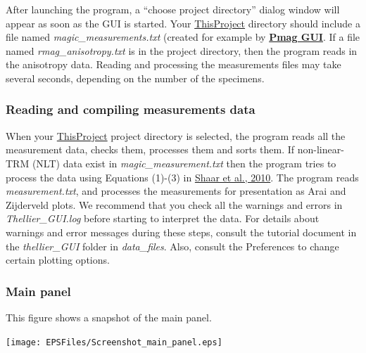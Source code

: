 \documentclass[11pt]{book}
\begin{document}
{{
After launching the program,  a  ``choose project directory'' dialog window will appear as soon as the GUI is started.
%
%
%
Your  \href{#Project_Directory}{ThisProject} directory should include a file named {\it magic\_measurements.txt} (created for example by \href{#pmag_gui.py}{\bf Pmag GUI}.   If a file named {\it rmag\_anisotropy.txt} is in the project directory, then the program reads in the anisotropy data. Reading and processing the measurements files may take several seconds, depending on the number of the specimens.


\subsubsection{Reading and compiling measurements data}
When your \href{#Project_Directory}{ThisProject}  project directory is selected, the program  reads all the measurement data, checks them, processes them and sorts them. If non-linear-TRM (NLT) data exist in {\it magic\_measurement.txt}  then the program tries to process the data using Equations (1)-(3) in \href{http://dx.doi.org/10.7288/V4/MAGIC/12116}{Shaar et al., 2010}. \nocite{shaar10}  The program reads {\it measurement.txt}, and processes the measurements for presentation as Arai  and Zijderveld plots.
We recommend that you check all the warnings and errors in {\it Thellier\_GUI.log} before starting to interpret the data.  For details about warnings and error messages during these steps, consult the tutorial document in the {\it thellier\_GUI} folder in  {\it data\_files}.  Also, consult the Preferences to change certain plotting options.

\subsubsection{Main panel}

This figure shows a snapshot of the main panel.

  \texttt{[image: EPSFiles/Screenshot\_main\_panel.eps]}

}}
\end{document}
